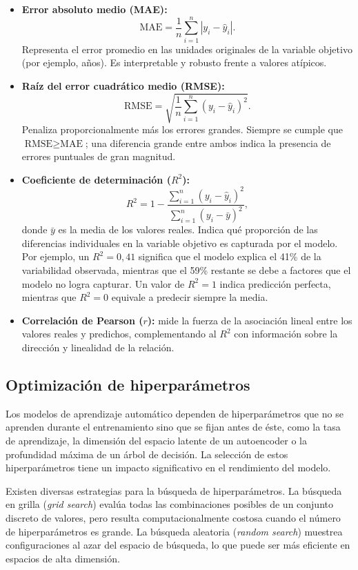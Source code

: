 \begin{itemize}
    \item \textbf{Error absoluto medio (MAE):}
    \[
    \text{MAE} = \frac{1}{n} \sum_{i=1}^{n} |y_i - \hat{y}_i|.
    \]
    Representa el error promedio en las unidades originales de la variable objetivo (por ejemplo, años). Es interpretable y robusto frente a valores atípicos.

    \item \textbf{Raíz del error cuadrático medio (RMSE):}
    \[
    \text{RMSE} = \sqrt{\frac{1}{n} \sum_{i=1}^{n} (y_i - \hat{y}_i)^2}.
    \]
    Penaliza proporcionalmente más los errores grandes. Siempre se cumple que $\text{RMSE} \geq \text{MAE}$; una diferencia grande entre ambos indica la presencia de errores puntuales de gran magnitud.

    \item \textbf{Coeficiente de determinación ($R^2$):}
    \[
    R^2 = 1 - \frac{\sum_{i=1}^{n} (y_i - \hat{y}_i)^2}{\sum_{i=1}^{n} (y_i - \bar{y})^2},
    \]
    donde $\bar{y}$ es la media de los valores reales. Indica qué proporción de las diferencias individuales en la variable objetivo es capturada por el modelo. Por ejemplo, un $R^2 = 0{,}41$ significa que el modelo explica el 41\% de la variabilidad observada, mientras que el 59\% restante se debe a factores que el modelo no logra capturar. Un valor de $R^2 = 1$ indica predicción perfecta, mientras que $R^2 = 0$ equivale a predecir siempre la media.

    \item \textbf{Correlación de Pearson ($r$):} mide la fuerza de la asociación lineal entre los valores reales y predichos, complementando al $R^2$ con información sobre la dirección y linealidad de la relación.
\end{itemize}

\subsection{Optimización de hiperparámetros}
\label{sec:hpo_theory}

Los modelos de aprendizaje automático dependen de hiperparámetros que no se aprenden durante el entrenamiento sino que se fijan antes de éste, como la tasa de aprendizaje, la dimensión del espacio latente de un autoencoder o la profundidad máxima de un árbol de decisión. La selección de estos hiperparámetros tiene un impacto significativo en el rendimiento del modelo.

Existen diversas estrategias para la búsqueda de hiperparámetros. La búsqueda en grilla (\textit{grid search}) evalúa todas las combinaciones posibles de un conjunto discreto de valores, pero resulta computacionalmente costosa cuando el número de hiperparámetros es grande. La búsqueda aleatoria (\textit{random search}) muestrea configuraciones al azar del espacio de búsqueda, lo que puede ser más eficiente en espacios de alta dimensión.

